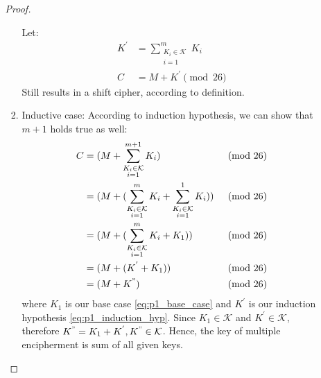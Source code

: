 \documentclass[11pt]{article}
\newcommand{\K}{\mathcal{K}}
\theoremstyle{definition}
\begin{document}
\begin{enumerate}
\begin{enumerate}
\begin{proof}
\begin{enumerate}
              Let: \\
              \begin{equation} \label{eq:p1_induction_hyp}
              \begin{aligned}
                K^{'} &= \sum^m_{\substack{K_i \in \K \\ i = 1}} K_i \\
                C &= M + K^{'} \pmod {26}
              \end{aligned}
              \end{equation}
              Still results in a shift cipher, according to definition.
            \item
              Inductive case: According to induction hypothesis, we can show that $m + 1$ holds true as well:
              \begin{align*}
                C &= (M + \sum^{m + 1}_{\substack{K_i \in \K \\ i = 1}} K_i) &\pmod {26} \\
                  &= (M + (\sum^{m}_{\substack{K_i \in \K \\ i = 1}} K_i + \sum^{1}_{\substack{K_i \in \K \\ i = 1}} K_i)) &\pmod {26} \\
                  &= (M + (\sum^{m}_{\substack{K_i \in \K \\ i = 1}} K_i + K_1)) &\pmod {26} \\
                  &= (M + (K^{'} + K_1)) &\pmod {26} \\
                  &= (M + K^{"}) &\pmod {26} \\
              \end{align*}
              where $K_1$ is our base case \eqref{eq:p1_base_case} and $K^{'}$ is our induction hypothesis \eqref{eq:p1_induction_hyp}. Since $K_1 \in \K$ and $K^{'} \in \K$, therefore $K^{"} = K_1 + K^{'}, K^{"} \in \K$. Hence, the key of multiple encipherment is sum of all given keys.
          \end{enumerate}
        \end{proof}
    \end{enumerate}


\end{enumerate}
\end{document}
